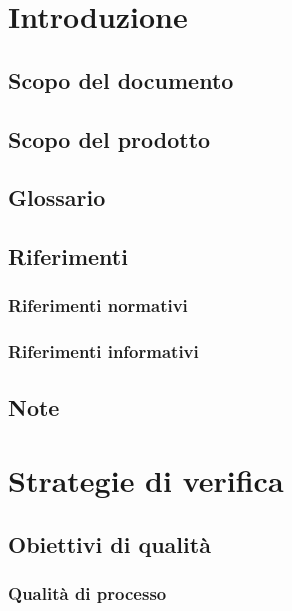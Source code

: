 \documentclass[a4paper, oneside, openany, dvipsnames, table]{article}
\begin{document}
\copertina{}

\newpage
\tableofcontents
\newpage
\listoffigures
\newpage
\listoftables
\newpage
\section{Introduzione}
	\subsection{Scopo del documento}
		
	\subsection{Scopo del prodotto}
		
	\subsection{Glossario}
		
	\subsection{Riferimenti}
		\subsubsection{Riferimenti normativi}
			
		\subsubsection{Riferimenti informativi}
			
	\subsection{Note}
			
	\newpage
\section{Strategie di verifica}
	
	\subsection{Obiettivi di qualità}
		\subsubsection{Qualità di processo}
			
\end{document}
